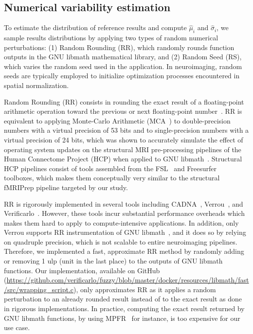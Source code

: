 \documentclass[lettersize,journal]{IEEEtran}
\begin{document}
\subsection{Numerical variability estimation}

To estimate the distribution of reference results and compute $\hat \mu_i$ and $\hat \sigma_i$, we sample results distributions by applying two types of random numerical perturbations: (1) Random Rounding (RR), which randomly rounds function outputs in the GNU libmath mathematical library, and (2) Random Seed (RS), which varies the random seed used in the application. In neuroimaging, random seeds are typically employed to initialize optimization processes encountered in spatial normalization.

Random Rounding (RR) consists in rounding the exact result of a floating-point arithmetic operation toward the previous or next floating-point number~\cite{forsythe1959reprint}. RR is equivalent to applying Monte-Carlo Arithmetic (MCA~\cite{parker1997monte}) to double-precision numbers with a virtual precision of 53 bits and to single-precision numbers with a virtual precision of 24 bits, which was shown to accurately simulate the effect of operating system updates on the structural MRI pre-processing pipelines of the Human Connectome Project (HCP) when applied to GNU libmath~\cite{salari2021accurate}. Structural HCP pipelines consist of tools assembled from the FSL~\cite{jenkinson2012fsl} and Freesurfer~\cite{fischl2012freesurfer} toolboxes, which makes them conceptually very similar to the structural fMRIPrep pipeline targeted by our study.

RR is rigorously implemented in several tools including CADNA~\cite{jezequel2008cadna}, Verrou~\cite{fevotte2016verrou}, and Verificarlo~\cite{denis2016verificarlo}.
However, these tools incur substantial performance overheads which makes them hard to apply to compute-intensive applications. In addition, only Verrou supports RR instrumentation of GNU libmath~\cite{fevotte2019debugging}, and it does so by relying on quadruple precision, which is not scalable to entire neuroimaging pipelines.
Therefore, we implemented a fast, approximate RR method by randomly adding or removing 1 ulp (unit in the last place) to the outputs of GNU libmath functions.
Our implementation, available on GitHub (\url{https://github.com/verificarlo/fuzzy/blob/master/docker/resources/libmath/fast/src/wrapping\_script.c}),  only approximates RR as it applies a random perturbation to an already rounded result instead of to the exact result as done in rigorous implementations. In practice, computing the exact result returned by GNU libmath functions, by using MPFR~\cite{fousse2007mpfr} for instance, is too expensive for our use case.
\end{document}
